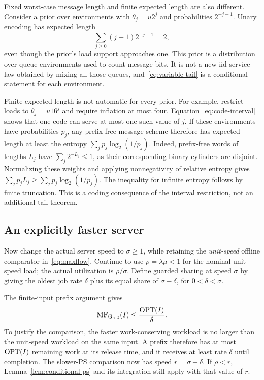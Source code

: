 Fixed worst-case message length and finite expected length are also different. Consider a prior over environments with $\theta_j=u2^j$ and probabilities $2^{-j-1}$. Unary encoding has expected length
\[
 \sum_{j\geq0}(j+1)2^{-j-1}=2,
\]
even though the prior's load support approaches one. This prior is a distribution over queue environments used to count message bits. It is not a new iid service law obtained by mixing all those queues, and~\eqref{eq:variable-tail} is a conditional statement for each environment.

Finite expected length is not automatic for every prior. For example, restrict loads to $\theta_j=u16^j$ and require inflation at most four. Equation~\eqref{eq:code-interval} shows that one code can serve at most one such value of $j$. If these environments have probabilities $p_j$, any prefix-free message scheme therefore has expected length at least the entropy $\sum_j p_j\log_2(1/p_j)$. Indeed, prefix-free words of lengths $L_j$ have $\sum_j2^{-L_j}\leq1$, as their corresponding binary cylinders are disjoint. Normalizing these weights and applying nonnegativity of relative entropy gives $\sum_jp_jL_j\geq\sum_jp_j\log_2(1/p_j)$. The inequality for infinite entropy follows by finite truncation. This is a coding consequence of the interval restriction, not an additional tail theorem.

\subsection{An explicitly faster server}
Now change the actual server speed to $\sigma\geq1$, while retaining the \emph{unit-speed} offline comparator in~\eqref{eq:maxflow}. Continue to use $\rho=\lambda\mu<1$ for the nominal unit-speed load; the actual utilization is $\rho/\sigma$. Define guarded sharing at speed $\sigma$ by giving the oldest job rate $\delta$ plus its equal share of $\sigma-\delta$, for $0<\delta<\sigma$.

The finite-input prefix argument gives
\begin{equation}\label{eq:fast-competitive}
 \operatorname{MF}_{\operatorname{G}_{\sigma,\delta}}(I)\leq\frac{\operatorname{OPT}(I)}\delta.
\end{equation}
To justify the comparison, the faster work-conserving workload is no larger than the unit-speed workload on the same input. A prefix therefore has at most $\operatorname{OPT}(I)$ remaining work at its release time, and it receives at least rate $\delta$ until completion. The slower-PS comparison now has speed $r=\sigma-\delta$. If $\rho<r$, Lemma~\ref{lem:conditional-ps} and its integration still apply with that value of $r$.

